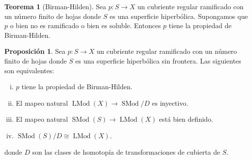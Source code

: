\documentclass[spanish]{article}
\theoremstyle{definition}
\newtheorem*{teo}{Teorema}
\newtheorem*{prop}{Proposición}
\DeclareMathOperator{\SMod}{SMod}
\DeclareMathOperator{\LMod}{LMod}
\begin{document}
\begin{teo}[Birman-Hilden]
	Sea $p:S\to X$ un cubriente regular ramificado con un número finito de hojas donde $S$ es una superficie hiperbólica. Supongamos que $p$ o bien no es ramificado o bien es soluble. Entonces $p$ tiene la propiedad de Birman-Hilden.
\end{teo}
\begin{prop}
	Sea $p:S\to X$ un cubriente regular ramificado con un número finito de hojas donde $S$ es una superficie hiperbólica sin frontera. Las siguientes son equivalentes:
	\begin{enumerate}[(i)]
		\item $p$ tiene la propiedad de Birman-Hilden.
		\item El mapeo natural $\LMod(X)\to\SMod/D$ es inyectivo.
		\item El mapeo natural $\SMod(S)\to\LMod(X)$ está bien definido.
		\item $\SMod(S)/D\cong\LMod(X)$.
	\end{enumerate}
	donde $D$ son las clases de homotopía de transformaciones de cubierta de $S$.
\end{prop}
\end{document}
